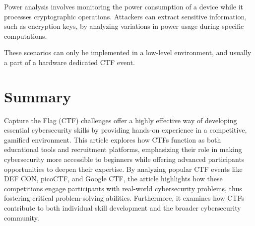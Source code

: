 \documentclass[conference]{IEEEtran}
\begin{document}
Power analysis involves monitoring the power consumption of a device while it
processes cryptographic operations. Attackers can extract sensitive
information, such as encryption keys, by analyzing variations in power usage
during specific computations.

These scenarios can only be implemented in a low-level environment, 
and usually a part of a hardware dedicated CTF event.

\section{Summary}

Capture the Flag (CTF) challenges offer a highly effective way of developing
essential cybersecurity skills by providing hands-on experience in a
competitive, gamified environment. This article explores how CTFs function as
both educational tools and recruitment platforms, emphasizing their role in
making cybersecurity more accessible to beginners while offering advanced
participants opportunities to deepen their expertise. By analyzing popular CTF
events like DEF CON, picoCTF, and Google CTF, the article highlights how these
competitions engage participants with real-world cybersecurity problems, thus
fostering critical problem-solving abilities. Furthermore, it examines how CTFs
contribute to both individual skill development and the broader cybersecurity
community.



\end{document}
